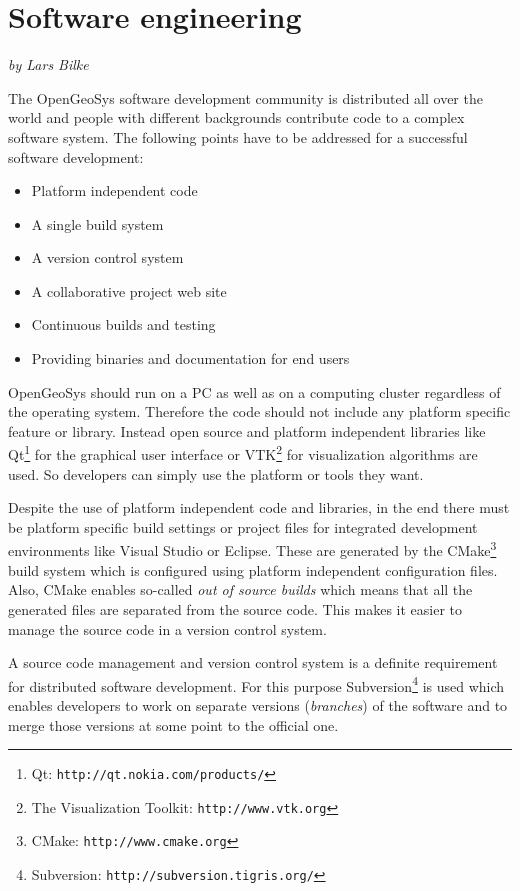 
\newcommand{\ogs}{OpenGeoSys }

\chapter{Software engineering}
\textit{by Lars Bilke}

\bigskip

The \ogs software development community is distributed all over the world and people with different backgrounds contribute code to a complex software system. The following points have to be addressed for a successful software development:

\begin{itemize}\addtolength{\itemsep}{-0.3\baselineskip}
\item Platform independent code
\item A single build system
\item A version control system
\item A collaborative project web site
\item Continuous builds and testing
\item Providing binaries and documentation for end users
\end{itemize}

\ogs should run on a PC as well as on a computing cluster regardless of the operating system. Therefore the code should not include any platform specific feature or library. Instead open source and platform independent libraries like Qt\footnote{Qt: \texttt{http://qt.nokia.com/products/}} for the graphical user interface or VTK\footnote{The Visualization Toolkit: \texttt{http://www.vtk.org}} for visualization algorithms are used. So developers can simply use the platform or tools they want.

Despite the use of platform independent code and libraries, in the end there must be platform specific build settings or project files for integrated development environments like Visual Studio or Eclipse. These are generated by the CMake\footnote{CMake: \texttt{http://www.cmake.org}} build system which is configured using platform independent configuration files. Also, CMake enables so-called \emph{out of source builds} which means that all the generated files are separated from the source code. This makes it easier to manage the source code in a version control system.

A source code management and version control system is a definite requirement for distributed software development. For this purpose Subversion\footnote{Subversion: \texttt{http://subversion.tigris.org/}} is used which enables developers to work on separate versions (\emph{branches}) of the software and to merge those versions at some point to the official one.


